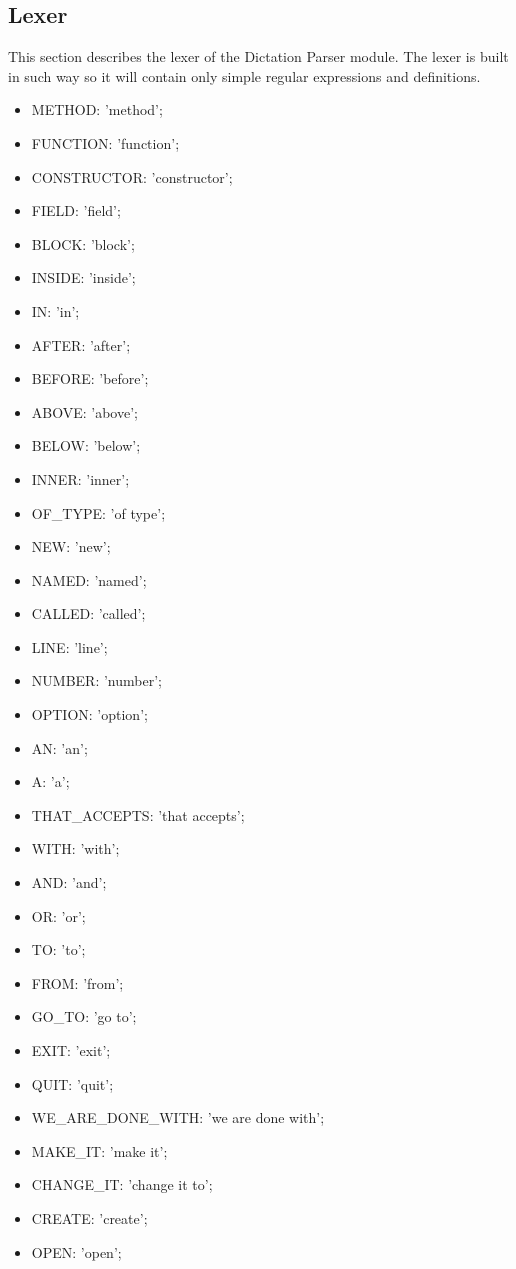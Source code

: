 \subsection{Lexer}
This section describes the lexer of the Dictation Parser module. The lexer is built in such way so it will contain only simple regular expressions and definitions.
\begin{itemize}
	\item METHOD: 'method';
	\item FUNCTION: 'function';
	\item CONSTRUCTOR: 'constructor';
	\item FIELD: 'field';
	\item BLOCK: 'block';
	\item INSIDE: 'inside';
	\item IN: 'in';
	\item AFTER: 'after';
	\item BEFORE: 'before';
	\item ABOVE: 'above';
	\item BELOW: 'below';
	\item INNER: 'inner';
	\item OF\_TYPE: 'of type';
	\item NEW: 'new';
	\item NAMED: 'named';
	\item CALLED: 'called';
	\item LINE: 'line';
	\item NUMBER: 'number';
	\item OPTION: 'option';
	\item AN: 'an';
	\item A: 'a';
	\item THAT\_ACCEPTS: 'that accepts';
	\item WITH: 'with';
	\item AND: 'and';
	\item OR: 'or';
	\item TO: 'to';
	\item FROM: 'from';
	\item GO\_TO: 'go to';
	\item EXIT: 'exit';
	\item QUIT: 'quit';
	\item WE\_ARE\_DONE\_WITH: 'we are done with';
	\item MAKE\_IT: 'make it';
	\item CHANGE\_IT: 'change it to';
	\item CREATE: 'create';
	\item OPEN: 'open';

\end{itemize}
